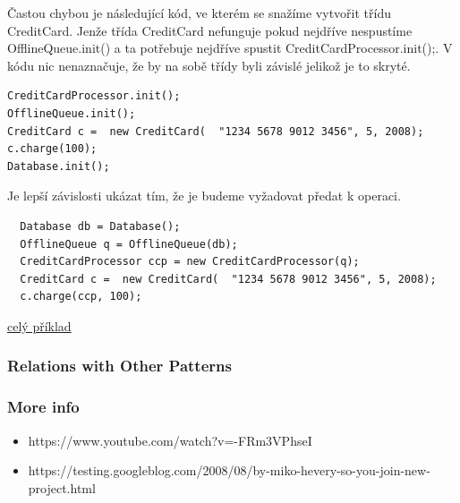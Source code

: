 \documentclass{article}
\begin{document}
Častou chybou je následující kód, ve kterém se snažíme vytvořit třídu CreditCard. 
Jenže třída CreditCard nefunguje pokud nejdříve nespustíme OfflineQueue.init() a ta potřebuje nejdříve spustit CreditCardProcessor.init();. 
V kódu nic nenaznačuje, že by na sobě třídy byli závislé jelikož je to skryté.  
\begin{lstlisting}
CreditCardProcessor.init();
OfflineQueue.init();
CreditCard c =  new CreditCard(  "1234 5678 9012 3456", 5, 2008);
c.charge(100);
Database.init(); 
\end{lstlisting}
Je lepší závislosti ukázat tím, že je budeme vyžadovat předat k operaci. 
\begin{lstlisting}
  Database db = Database();
  OfflineQueue q = OfflineQueue(db);
  CreditCardProcessor ccp = new CreditCardProcessor(q);
  CreditCard c =  new CreditCard(  "1234 5678 9012 3456", 5, 2008);
  c.charge(ccp, 100);
\end{lstlisting}
\href{https://youtu.be/-FRm3VPhseI?si=2yfLyOmljdnVgoLU&t=1133}{celý příklad}

\subsubsection{Relations with Other Patterns}
\subsubsection{More info}
\begin{itemize}
  \item https://www.youtube.com/watch?v=-FRm3VPhseI
  \item https://testing.googleblog.com/2008/08/by-miko-hevery-so-you-join-new-project.html
\end{itemize}
\end{document}

